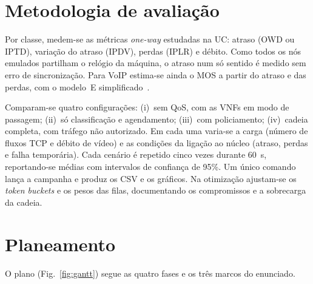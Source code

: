 \documentclass[a4paper]{llncs}
\begin{document}
\section{Metodologia de avaliação}

Por classe, medem-se as métricas \emph{one-way} estudadas na UC: atraso (OWD ou IPTD),
variação do atraso (IPDV), perdas (IPLR) e débito. Como todos os nós emulados partilham
o relógio da máquina, o atraso num só sentido é medido sem erro de sincronização. Para
VoIP estima-se ainda o MOS a partir do atraso e das perdas, com o modelo~E
simplificado~\cite{cole}.

Comparam-se quatro configurações: (i)~sem QoS, com as VNFs em modo de passagem;
(ii)~só classificação e agendamento; (iii)~com policiamento; (iv)~cadeia completa, com
tráfego não autorizado. Em cada uma varia-se a carga (número de fluxos TCP e débito de
vídeo) e as condições da ligação ao núcleo (atraso, perdas e falha temporária). Cada
cenário é repetido cinco vezes durante 60~s, reportando-se médias com intervalos de
confiança de 95\%. Um único comando lança a campanha e produz os CSV e os gráficos. Na
otimização ajustam-se os \emph{token buckets} e os pesos das filas, documentando os
compromissos e a sobrecarga da cadeia.

\section{Planeamento}

O plano (Fig.~\ref{fig:gantt}) segue as quatro fases e os três marcos do enunciado.
\end{document}
